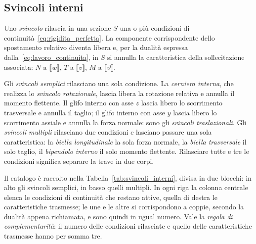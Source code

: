 



\subsection{Svincoli interni}
\label{sec:svincoli_interni}

Uno \emph{svincolo} rilascia in
una sezione $S$ una o più condizioni di
continuità~\eqref{eq:rigidita_perfetta}. La componente
corrispondente dello spostamento relativo diventa libera
e, per la dualità espressa dalla~\eqref{eq:lavoro_continuita},
in $S$ si annulla la caratteristica della sollecitazione
associata: $N$ a $\llbracket w \rrbracket$, $T$ a
$\llbracket v \rrbracket$, $M$ a
$\llbracket \vartheta \rrbracket$.

Gli \emph{svincoli semplici}
rilasciano una sola condizione. La \emph{cerniera
	interna}, che realizza lo
\emph{svincolo rotazionale},
lascia libera la rotazione relativa e annulla il momento
flettente. Il glifo interno con asse $z$ lascia libero
lo scorrimento trasversale e annulla il taglio; il glifo
interno con asse $y$ lascia libero lo scorrimento assiale
e annulla la forza normale: sono gli \emph{svincoli
	traslazionali}.
Gli \emph{svincoli multipli}
rilasciano due condizioni e lasciano passare una sola
caratteristica: la \emph{biella longitudinale}
la sola forza normale, la \emph{biella trasversale}
il solo taglio, il \emph{bipendolo interno}
il solo momento flettente. Rilasciare tutte e tre le
condizioni significa separare la trave in due corpi.

Il catalogo è raccolto nella
Tabella~\ref{tab:svincoli_interni}, divisa in due
blocchi: in alto gli svincoli semplici, in basso quelli
multipli. In ogni riga la colonna centrale elenca le
condizioni di continuità che restano attive, quella di
destra le caratteristiche trasmesse; le une e le altre si
corrispondono a coppie, secondo la dualità appena
richiamata, e sono quindi in ugual numero. Vale la
\emph{regola di complementarità}:
il numero delle condizioni rilasciate e quello delle
caratteristiche trasmesse hanno per somma tre.

